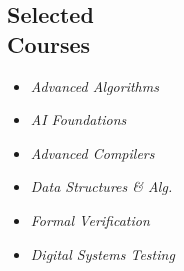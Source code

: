 \documentclass[line,margin,letter]{resume}
\begin{document}
\begin{resume}
\section{\mysidestyle Selected\\Courses}
    \vspace{-0.02cm}
        \begin{multicols}{3}
        \begin{itemize}
        \item[] \emph{Advanced Algorithms}
        \item[] \emph{AI Foundations}
        \item[] \emph{Advanced Compilers}
        \item[] \emph{Data Structures \& Alg.}
        \item[] \emph{Formal Verification}
        \item[] \emph{Digital Systems Testing}
        \end{itemize}
        \end{multicols}
    
        

\end{resume}
\end{document}
